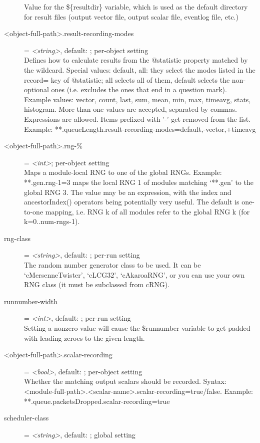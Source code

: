 \begin{description}
    Value for the \$\{resultdir\} variable, which is used as the default
    directory for result files (output vector file, output scalar file,
    eventlog file, etc.)
\item[<object-full-path>.result-recording-modes] = \textit{<string>}, default: ; per-object setting \\
    Defines how to calculate results from the @statistic property matched by
    the wildcard. Special values: default, all: they select the modes listed in
    the record= key of @statistic; all selects all of them, default selects the
    non-optional ones (i.e. excludes the ones that end in a question mark).
    Example values: vector, count, last, sum, mean, min, max, timeavg, stats,
    histogram. More than one values are accepted, separated by commas.
    Expressions are allowed. Items prefixed with '-' get removed from the list.
    Example: **.queueLength.result-recording-modes=default,-vector,+timeavg
\item[<object-full-path>.rng-\%] = \textit{<int>}; per-object setting \\
    Maps a module-local RNG to one of the global RNGs. Example: **.gen.rng-1=3
    maps the local RNG 1 of modules matching `**.gen' to the global RNG 3. The
    value may be an expression, with the index and ancestorIndex() operators
    being potentially very useful. The default is one-to-one mapping, i.e. RNG
    k of all modules refer to the global RNG k (for k=0..num-rngs-1).
\item[rng-class] = \textit{<string>}, default: ; per-run setting \\
    The random number generator class to be used. It can be `cMersenneTwister',
    `cLCG32', `cAkaroaRNG', or you can use your own RNG class (it must be
    subclassed from cRNG).
\item[runnumber-width] = \textit{<int>}, default: ; per-run setting \\
    Setting a nonzero value will cause the \$runnumber variable to get padded
    with leading zeroes to the given length.
\item[<object-full-path>.scalar-recording] = \textit{<bool>}, default: ; per-object setting \\
    Whether the matching output scalars should be recorded. Syntax:
    <module-full-path>.<scalar-name>.scalar-recording=true/false. Example:
    **.queue.packetsDropped.scalar-recording=true
\item[scheduler-class] = \textit{<string>}, default: ; global setting \\

\end{description}
